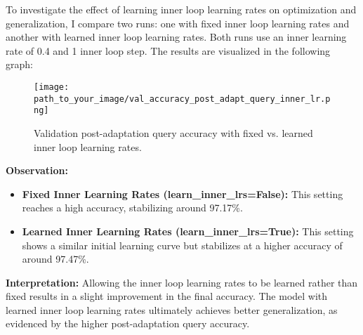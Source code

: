 \begin{answer}
        To investigate the effect of learning inner loop learning rates on optimization and generalization, I compare two runs: one with fixed inner loop learning rates and another with learned inner loop learning rates. Both runs use an inner learning rate of 0.4 and 1 inner loop step. The results are visualized in the following graph:

\begin{figure}[H]
    \centering
    \texttt{[image: path\_to\_your\_image/val\_accuracy\_post\_adapt\_query\_inner\_lr.png]}
    \caption{Validation post-adaptation query accuracy with fixed vs. learned inner loop learning rates.}
\end{figure}

\textbf{Observation:}
\begin{itemize}
    \item \textbf{Fixed Inner Learning Rates (learn\_inner\_lrs=False):} This setting reaches a high accuracy, stabilizing around 97.17\%.
    \item \textbf{Learned Inner Learning Rates (learn\_inner\_lrs=True):} This setting shows a similar initial learning curve but stabilizes at a higher accuracy of around 97.47\%.
\end{itemize}

\textbf{Interpretation:}
Allowing the inner loop learning rates to be learned rather than fixed results in a slight improvement in the final accuracy. The model with learned inner loop learning rates ultimately achieves better generalization, as evidenced by the higher post-adaptation query accuracy.

\end{answer}





